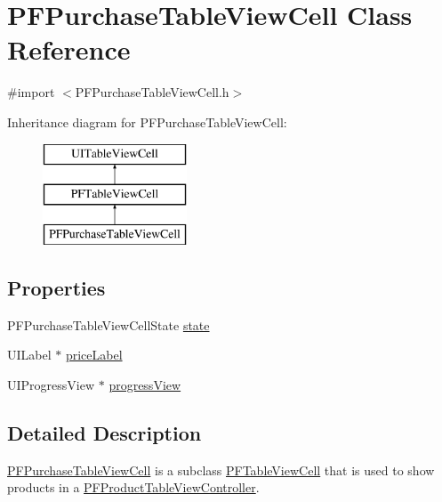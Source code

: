 \hypertarget{interface_p_f_purchase_table_view_cell}{}\section{P\+F\+Purchase\+Table\+View\+Cell Class Reference}
\label{interface_p_f_purchase_table_view_cell}


{\ttfamily \#import $<$P\+F\+Purchase\+Table\+View\+Cell.\+h$>$}

Inheritance diagram for P\+F\+Purchase\+Table\+View\+Cell\+:\begin{figure}[H]
\begin{center}
\leavevmode
\includegraphics[height=3.000000cm]{interface_p_f_purchase_table_view_cell}
\end{center}
\end{figure}
\subsection*{Properties}
\begin{DoxyCompactItemize}
\item 
P\+F\+Purchase\+Table\+View\+Cell\+State \hyperlink{interface_p_f_purchase_table_view_cell_a8cf6055cf2d5913a1b9ae6f547354fae}{state}
\item 
U\+I\+Label $\ast$ \hyperlink{interface_p_f_purchase_table_view_cell_a6378d4df911a53f6dca814d5f18af9aa}{price\+Label}
\item 
U\+I\+Progress\+View $\ast$ \hyperlink{interface_p_f_purchase_table_view_cell_a770a461f20f812e020c5b5daae002351}{progress\+View}
\end{DoxyCompactItemize}


\subsection{Detailed Description}
{\ttfamily \hyperlink{interface_p_f_purchase_table_view_cell}{P\+F\+Purchase\+Table\+View\+Cell}} is a subclass {\ttfamily \hyperlink{interface_p_f_table_view_cell}{P\+F\+Table\+View\+Cell}} that is used to show products in a {\ttfamily \hyperlink{interface_p_f_product_table_view_controller}{P\+F\+Product\+Table\+View\+Controller}}.

